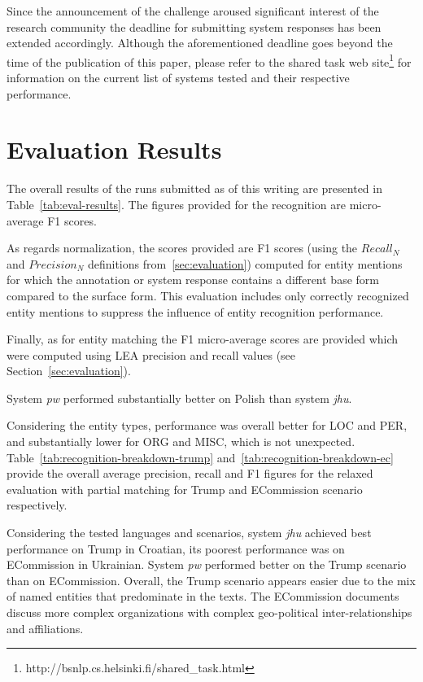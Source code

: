 \documentclass[11pt]{article}
\begin{document}
Since the announcement of the challenge aroused significant interest of 
the research community the deadline for submitting system responses
has been extended accordingly. Although the aforementioned deadline
goes beyond the time of the publication of this paper, please refer
to the shared task web site\footnote{http://bsnlp.cs.helsinki.fi/shared\_task.html}
for information on the current list of systems tested and their respective
performance. 

\section{Evaluation Results}
\label{sec:results}

The overall results of the runs submitted as of this writing are presented in
Table~\ref{tab:eval-results}. The figures provided for the recognition are
micro-average F1 scores. 

As regards normalization, the scores provided are F1 scores (using the $Recall_{N}$ and $Precision_{N}$ definitions 
from~\ref{sec:evaluation}) computed for entity mentions for which the annotation or 
system response contains a different base form compared to the surface form. 
This evaluation includes only correctly recognized entity mentions to suppress 
the influence of entity recognition performance.

Finally, as for entity matching the F1 micro-average scores are provided which were computed using 
LEA precision and recall values (see Section~\ref{sec:evaluation}).

System {\em pw} performed substantially better on Polish than system {\em
  jhu}.

Considering the entity types, performance was overall better for LOC and
PER, and substantially lower for ORG and MISC, which is not unexpected. 
Table~\ref{tab:recognition-breakdown-trump} and~\ref{tab:recognition-breakdown-ec}
provide the overall average precision, recall and F1 figures for the relaxed evaluation
with partial matching for {\sc Trump} and {\sc ECommission} scenario respectively.

Considering the tested languages and scenarios, system {\em jhu} achieved
best performance on {\sc Trump} in Croatian, its poorest performance was on {\sc ECommission}
in Ukrainian.  System {\em pw} performed better on the {\sc Trump}
scenario than on {\sc ECommission}.  Overall, the {\sc Trump} scenario appears easier
due to the mix of named entities that predominate in the texts.  The {\sc ECommission} documents 
discuss more complex organizations with complex geo-political inter-relationships and affiliations.
\end{document}
